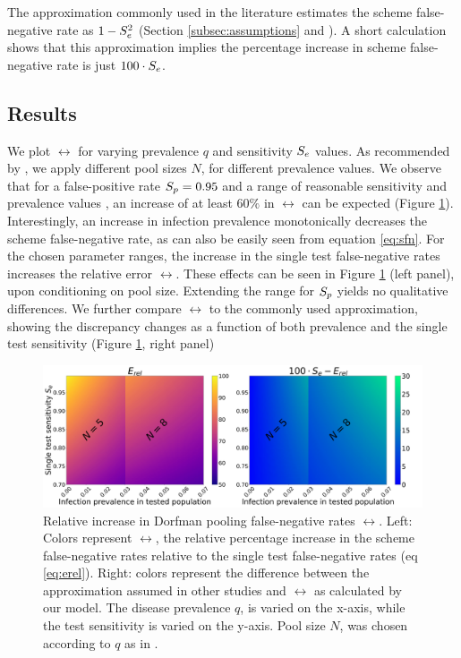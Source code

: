 \documentclass{article}
\begin{document}
The approximation commonly used in the literature estimates the scheme
false-negative rate as $1-S_e^2$ (Section \ref{subsec:assumptions} and
\cite{Simplistic1, Simplistic2, Kim, OptimalDorfmanPool}). A short
calculation shows that this approximation implies the percentage
increase in scheme false-negative rate is just $100\cdot S_e$.

\subsection{Results}\label{section:results}

We plot $\rel$ for varying prevalence $q$ and sensitivity $S_e$
values. As recommended by \cite{DorfmanYuvalDor}, we apply different
pool sizes $N$, for different prevalence values. We observe that for a
false-positive rate $S_p=0.95$ \cite{DorfmanYuvalDor} and a range of
reasonable sensitivity and prevalence values \cite{KitComparison,
  InterpretingCOVID19Test, EstimatingRatesLourenco,
  FalsePositiveEstimate}, an increase of at least $60\%$ in $\rel$ can
be expected (Figure \ref{figy}). Interestingly, an increase in
infection prevalence monotonically decreases the scheme false-negative
rate, as can also be easily seen from equation \eqref{eq:sfn}. For the
chosen parameter ranges, the increase in the single test
false-negative rates increases the relative error $\rel$. These
effects can be seen in Figure \ref{figy} (left panel), upon
conditioning on pool size. Extending the range for $S_p$ yields no
qualitative differences. We further compare $\rel$ to the commonly
used approximation, showing the discrepancy changes as a function of
both prevalence and the single test sensitivity (Figure \ref{figy},
right panel)
\begin{figure}[H]
    \centering
    \includegraphics[width=18cm]{heatmap.jpg}
    \caption{Relative increase in Dorfman pooling false-negative rates
      $\rel$. Left: Colors represent $\rel$, the relative percentage
      increase in the scheme false-negative rates relative to the
      single test false-negative rates (eq \eqref{eq:erel}). Right:
      colors represent the difference between the approximation
      assumed in other studies and $\rel$ as calculated by our
      model. The disease prevalence $q$, is varied on the x-axis,
      while the test sensitivity is varied on the y-axis. Pool size
      $N$, was chosen according to $q$ as in
      \cite{DorfmanYuvalDor}.}\label{figy}
 \end{figure}
\end{document}
